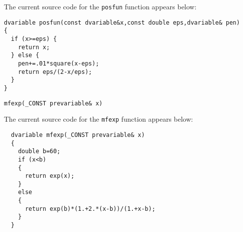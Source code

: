 The current source code for the \texttt{posfun} function appears below:
\begin{lstlisting}
dvariable posfun(const dvariable&x,const double eps,dvariable& pen)
{
  if (x>=eps) {
    return x;
  } else {
    pen+=.01*square(x-eps);
    return eps/(2-x/eps);
  }
}
\end{lstlisting}

\begin{lstlisting}
mfexp(_CONST prevariable& x)
\end{lstlisting}
The current source code for the \texttt{mfexp} function appears below:
\begin{lstlisting}
  dvariable mfexp(_CONST prevariable& x)
  {
    double b=60;
    if (x<b) 
    {
      return exp(x);
    }
    else
    {
      return exp(b)*(1.+2.*(x-b))/(1.+x-b);
    }
  }
\end{lstlisting}


